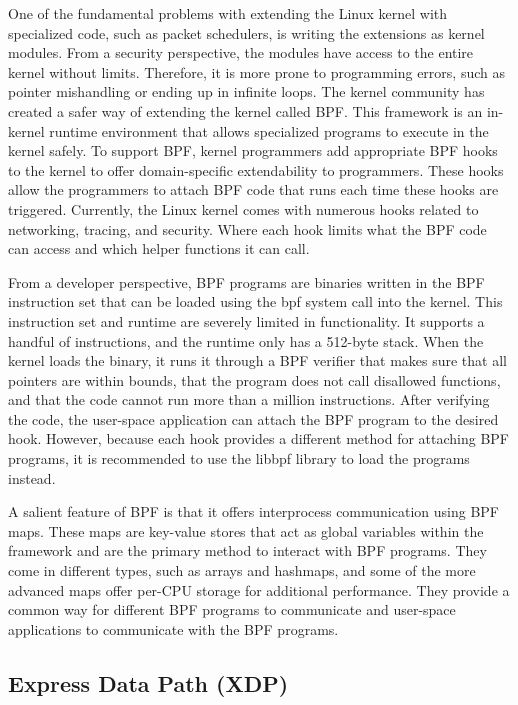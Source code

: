 \documentclass[sigconf, nonacm]{acmart}
\begin{document}
One of the fundamental problems with extending the Linux kernel with specialized code, such as packet schedulers, is writing the extensions as kernel modules. From a security perspective, the modules have access to the entire kernel without limits. Therefore, it is more prone to programming errors, such as pointer mishandling or ending up in infinite loops. The kernel community has created a safer way of extending the kernel called BPF. This framework is an in-kernel runtime environment that allows specialized programs to execute in the kernel safely. To support BPF, kernel programmers add appropriate BPF hooks to the kernel to offer domain-specific extendability to programmers. These hooks allow the programmers to attach BPF code that runs each time these hooks are triggered. Currently, the Linux kernel comes with numerous hooks related to networking, tracing, and security. Where each hook limits what the BPF code can access and which helper functions it can call.

From a developer perspective, BPF programs are binaries written in the BPF instruction set that can be loaded using the bpf system call into the kernel. This instruction set and runtime are severely limited in functionality. It supports a handful of instructions, and the runtime only has a 512-byte stack. When the kernel loads the binary, it runs it through a BPF verifier that makes sure that all pointers are within bounds, that the program does not call disallowed functions, and that the code cannot run more than a million instructions. After verifying the code, the user-space application can attach the BPF program to the desired hook. However, because each hook provides a different method for attaching BPF programs, it is recommended to use the libbpf library to load the programs instead.

A salient feature of BPF is that it offers interprocess communication using BPF maps. These maps are key-value stores that act as global variables within the framework and are the primary method to interact with BPF programs. They come in different types, such as arrays and hashmaps, and some of the more advanced maps offer per-CPU storage for additional performance. They provide a common way for different BPF programs to communicate and user-space applications to communicate with the BPF programs.


\subsection{Express Data Path (XDP)} \label{sec:xdp}
\end{document}
